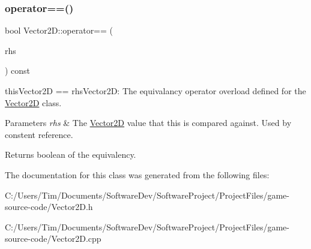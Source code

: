\subsubsection{\texorpdfstring{operator==()}{operator==()}}
{\footnotesize\ttfamily bool Vector2\+D\+::operator== (\begin{DoxyParamCaption}\item[{const \hyperlink{class_vector2_d}{Vector2D} \&}]{rhs }\end{DoxyParamCaption}) const}



this\+Vector2D == rhs\+Vector2D\+: The equivalancy operator overload defined for the \hyperlink{class_vector2_d}{Vector2D} class. 


\begin{DoxyParams}{Parameters}
{\em rhs} & The \hyperlink{class_vector2_d}{Vector2D} value that this is compared against. Used by constent reference. \\
\hline
\end{DoxyParams}
\begin{DoxyReturn}{Returns}
boolean of the equivalency. 
\end{DoxyReturn}


The documentation for this class was generated from the following files\+:\begin{DoxyCompactItemize}
\item 
C\+:/\+Users/\+Tim/\+Documents/\+Software\+Dev/\+Software\+Project/\+Project\+Files/game-\/source-\/code/Vector2\+D.\+h\item 
C\+:/\+Users/\+Tim/\+Documents/\+Software\+Dev/\+Software\+Project/\+Project\+Files/game-\/source-\/code/Vector2\+D.\+cpp\end{DoxyCompactItemize}
